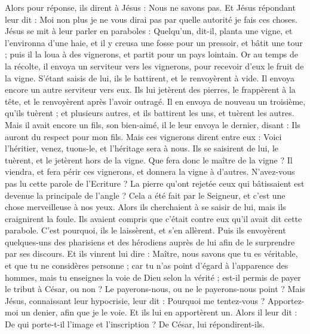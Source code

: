 \begin{multicols}{2}
Alors pour réponse, ils dirent à Jésus : Nous ne savons pas. Et Jésus répondant leur dit : Moi non plus je ne vous dirai pas par quelle autorité je fais ces choses.
\VerseOne{}Jésus se mit à leur parler en paraboles : Quelqu'un, dit-il, planta une vigne, et l'environna d'une haie, et il y creusa une fosse pour un pressoir, et bâtit une tour ; puis il la loua à des vignerons, et partit pour un pays lointain.
Or au temps de la récolte, il envoya un serviteur vers les vignerons, pour recevoir d'eux le fruit de la vigne.
S’étant saisis de lui, ils le battirent, et le renvoyèrent à vide.
Il envoya encore un autre serviteur vers eux. Ils lui jetèrent des pierres, le frappèrent à la tête, et le renvoyèrent après l'avoir outragé.
Il en envoya de nouveau un troisième, qu’ils tuèrent ; et plusieurs autres, et ils battirent les uns, et tuèrent les autres.
Mais il avait encore un fils, son bien-aimé, il le leur envoya le dernier, disant : Ils auront du respect pour mon fils.
Mais ces vignerons dirent entre eux : Voici l'héritier, venez, tuons-le, et l'héritage sera à nous.
Ils se saisirent de lui, le tuèrent, et le jetèrent hors de la vigne.
Que fera donc le maître de la vigne ? Il viendra, et fera périr ces vignerons, et donnera la vigne à d'autres.
N'avez-vous pas lu cette parole de l’Ecriture ? La pierre qu’ont rejetée ceux qui bâtissaient est devenue la principale de l’angle ?
Cela a été fait par le Seigneur, et c'est une chose merveilleuse à nos yeux.
Alors ils cherchaient à se saisir de lui, mais ils craignirent la foule. Ils avaient compris que c’était contre eux qu'il avait dit cette parabole. C'est pourquoi, ils le laissèrent, et s’en allèrent.
Puis ils envoyèrent quelques-uns des pharisiens et des hérodiens auprès de lui afin de le surprendre par ses discours.
Et ils vinrent lui dire : Maître, nous savons que tu es véritable, et que tu ne considères personne ; car tu n’as point d’égard à l’apparence des hommes, mais tu enseignes la voie de Dieu selon la vérité ; est-il permis de payer le tribut à César, ou non ? Le payerons-nous, ou ne le payerons-nous point ?
Mais Jésus, connaissant leur hypocrisie, leur dit : Pourquoi me tentez-vous ? Apportez-moi un denier, afin que je le voie.
Et ils lui en apportèrent un. Alors il leur dit : De qui porte-t-il l’image et l’inscription ? De César, lui répondirent-ils.

\end{multicols}
